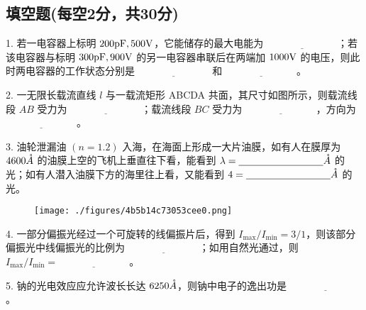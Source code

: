 \subsection{填空题(每空2分，共30分)}
1. 若一电容器上标明 $200 \\ \text{pF}, \\ 500 \\ \text{V}$，它能储存的最大电能为 $\underline{\hspace{3cm}}$；若该电容器与标明 $300 \\ \text{pF}, \\ 900 \\ \text{V}$ 的另一电容器串联后在两端加 $1000 \\ \text{V}$ 的电压，则此时两电容器的工作状态分别是 $\underline{\hspace{3cm}}$ 和 $\underline{\hspace{3cm}}$。

2. 一无限长载流直线 $l$ 与一载流矩形 ABCDA 共面，其尺寸如图所示，则载流线段 $AB$ 受力为 $\underline{\hspace{3cm}}$；载流线段 $BC$ 受力为 $\underline{\hspace{3cm}}$，方向为 $\underline{\hspace{3cm}}$。

3. 油轮泄漏油 $(n = 1.2)$ 入海，在海面上形成一大片油膜，如有人在膜厚为 $4600 \\ \mathring{A}$ 的油膜上空的飞机上垂直往下看，能看到 $\lambda= \underline{\hspace{3cm}}\\ \mathring{A}$ 的光；如有人潜入油膜下方的海里往上看，又能看到 $4 = \underline{\hspace{3cm}}\\ \mathring{A}$ 的光。
\begin{figure}[ht]
\centering
\texttt{[image: ./figures/4b5b14c73053cee0.png]}
\caption{} \label{fig_NJU08_2}
\end{figure}

4. 一部分偏振光经过一个可旋转的线偏振片后，得到 $I_{\max} / I_{\min} = 3 / 1$，则该部分偏振光中线偏振光的比例为 $\underline{\hspace{3cm}}$；如用自然光通过，则 $I_{\max} / I_{\min} = \underline{\hspace{3cm}}$。

5. 钠的光电效应应允许波长长达 $6250 \\ \mathring{A}$，则钠中电子的逸出功是 $\underline{\hspace{3cm}}$。

